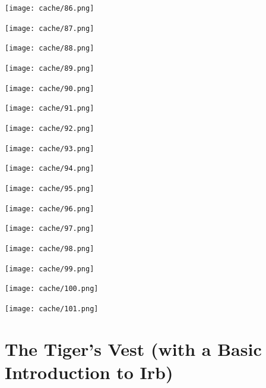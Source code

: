 \documentclass[12pt,twoside]{report}
\begin{document}
\vspace*{0.6cm} \texttt{[image: cache/86.png]}
\newpage

\vspace*{0.6cm} \texttt{[image: cache/87.png]}
\newpage

\vspace*{0.6cm} \texttt{[image: cache/88.png]}
\newpage

\vspace*{0.6cm} \texttt{[image: cache/89.png]}
\newpage

\vspace*{0.6cm} \texttt{[image: cache/90.png]}
\newpage

\vspace*{0.6cm} \texttt{[image: cache/91.png]}
\newpage

\vspace*{0.6cm} \texttt{[image: cache/92.png]}
\newpage

\vspace*{0.6cm} \texttt{[image: cache/93.png]}
\newpage

\vspace*{0.6cm} \texttt{[image: cache/94.png]}
\newpage

\vspace*{0.6cm} \texttt{[image: cache/95.png]}
\newpage

\vspace*{0.6cm} \texttt{[image: cache/96.png]}
\newpage

\vspace*{0.6cm}
\texttt{[image: cache/97.png]}
\newpage

\vspace*{0.6cm} \texttt{[image: cache/98.png]}
\newpage

\vspace*{0.6cm} \texttt{[image: cache/99.png]}
\newpage

\vspace*{0.6cm} \texttt{[image: cache/100.png]}
\newpage

\vspace*{0.6cm} \texttt{[image: cache/101.png]}
\newpage
\thispagestyle{empty}
\mbox{}
\newpage
\thispagestyle{empty}
\mbox{}

\cleartooddpage

\appendix
\renewcommand*{\thechapter}{\Roman{chapter}}
\chapter{The Tiger's Vest (with a Basic Introduction to Irb)}
\newpage
\thispagestyle{empty}
\mbox{}
\pagebreak
\end{document}
